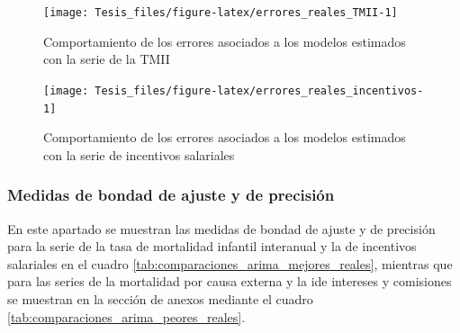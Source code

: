 \documentclass[
]{article}
\begin{document}
\begin{figure}[H]
\texttt{[image: Tesis\_files/figure-latex/errores\_reales\_TMII-1]} \caption{Comportamiento de los errores asociados a los modelos estimados con la serie de la TMII}\label{fig:errores_reales_TMII}
\end{figure}

\begin{figure}[H]
\texttt{[image: Tesis\_files/figure-latex/errores\_reales\_incentivos-1]} \caption{Comportamiento de los errores asociados a los modelos estimados con la serie de incentivos salariales}\label{fig:errores_reales_incentivos}
\end{figure}

\subsubsection{Medidas de bondad de ajuste y de precisión}

En este apartado se muestran las medidas de bondad de ajuste y de
precisión para la serie de la tasa de mortalidad infantil interanual y
la de incentivos salariales en el cuadro
\ref{tab:comparaciones_arima_mejores_reales}, mientras que para las
series de la mortalidad por causa externa y la ide intereses y
comisiones se muestran en la sección de anexos mediante el cuadro
\ref{tab:comparaciones_arima_peores_reales}.
\end{document}

